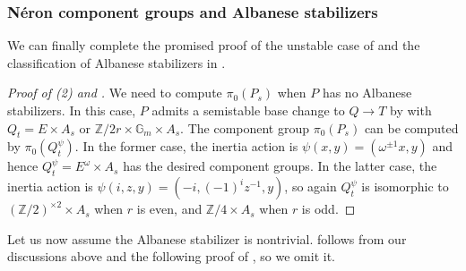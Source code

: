 \documentclass[reqno, letterpaper]{amsart}
\numberwithin{equation}{subsection}
\let\to\longrightarrow
\newcommand{\GG}{\mathbb{G}}
\newcommand{\ZZ}{\mathbb{Z}}
\begin{document}
			
			
		\subsubsection{N\'eron component groups and Albanese stabilizers} \label{sec:Neron component groups and Albanese stabilizers}
			We can finally complete the promised proof of the unstable case of  and the classification of Albanese stabilizers in .
			
			\begin{proof} [Proof of (2) and ]
				We need to compute $\pi_0(P_s)$ when $P$ has no Albanese stabilizers. In this case, $P$ admits a semistable base change to $Q \to T$ by  with $Q_t = E \times A_s$ or $\ZZ/2r \times \GG_m \times A_s$. The component group $\pi_0(P_s)$ can be computed by $\pi_0 (Q_t^\psi)$. In the former case, the inertia action is $\psi(x,y) = (\omega^{\pm1}x, y)$ and hence $Q_t^\psi = E^\omega \times A_s$ has the desired component groups. In the latter case, the inertia action is $\psi(i,z,y) = (-i, (-1)^i z^{-1}, y)$, so again $Q_t^\psi$ is isomorphic to $(\ZZ/2)^{\times 2} \times A_s$ when $r$ is even, and $\ZZ/4 \times A_s$ when $r$ is odd.
			\end{proof}
			
			
			Let us now assume the Albanese stabilizer is nontrivial.  follows from our discussions above and the following proof of , so we omit it.
			
\end{document}

